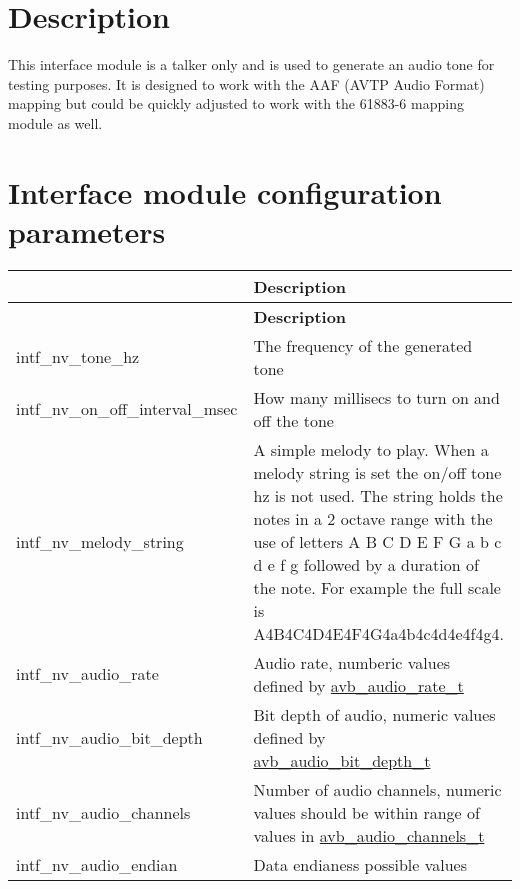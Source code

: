 \section*{Description}

This interface module is a talker only and is used to generate an audio tone for testing purposes. It is designed to work with the A\+AF (A\+V\+TP Audio Format) mapping but could be quickly adjusted to work with the 61883-\/6 mapping module as well.

\section*{Interface module configuration parameters}

\tabulinesep=1mm
\begin{longtabu} spread 0pt [c]{*2{|X[-1]}|}
\hline
{}&{\bf Description  }\\
\endfirsthead
\hline
\endfoot
\hline
{}&{\bf Description  }\\
\endhead
intf\+\_\+nv\+\_\+tone\+\_\+hz &The frequency of the generated tone \\
intf\+\_\+nv\+\_\+on\+\_\+off\+\_\+interval\+\_\+msec &How many millisecs to turn on and off the tone \\
intf\+\_\+nv\+\_\+melody\+\_\+string &A simple melody to play. When a melody string is set the on/off tone hz is not used. The string holds the notes in a 2 octave range with the use of letters A B C D E F G a b c d e f g followed by a duration of the note. For example the full scale is A4\+B4\+C4\+D4\+E4\+F4\+G4a4b4c4d4e4f4g4. \\
intf\+\_\+nv\+\_\+audio\+\_\+rate &Audio rate, numberic values defined by \hyperlink{openavb__audio__pub_8h_a6070f1cfbb6824de6f0b2524cd306903}{avb\+\_\+audio\+\_\+rate\+\_\+t} \\
intf\+\_\+nv\+\_\+audio\+\_\+bit\+\_\+depth &Bit depth of audio, numeric values defined by \hyperlink{openavb__audio__pub_8h_ae64ee32f6ac9a6b2cf607f46ee4160bd}{avb\+\_\+audio\+\_\+bit\+\_\+depth\+\_\+t} \\
intf\+\_\+nv\+\_\+audio\+\_\+channels &Number of audio channels, numeric values should be within range of values in \hyperlink{openavb__audio__pub_8h_a8cc6b9a1352da050ead620139f49acc4}{avb\+\_\+audio\+\_\+channels\+\_\+t} \\
intf\+\_\+nv\+\_\+audio\+\_\+endian &Data endianess possible values 

\end{longtabu}
